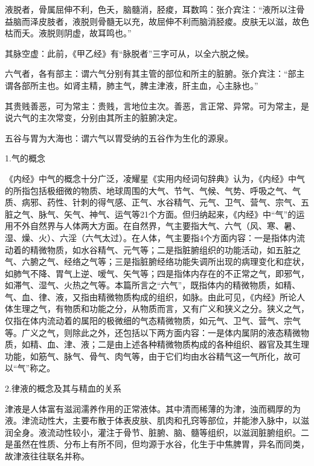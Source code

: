 \documentclass[12pt]{ctexbook}
\begin{document}
\begin{jiaozhu}
	\item 液脱者，骨属屈伸不利，色夭，脑髓消，胫痠，耳数鸣：张介宾注：“液所以注骨益脑而泽皮肢者，液脱则骨髓无以充，故屈伸不利而脑消胫痠。皮肤无以滋，故色枯而夭。液脱则阴虚，故耳鸣也。”
	\item 其脉空虚：此前，《甲乙经》有“脉脱者”三字可从，以全六脱之候。
	\item 六气者，各有部主：谓六气分别有其主管的部位和所主的脏腑。张介宾注：“部主谓各部所主也。如肾主精，肺主气，脾主津液，肝主血，心主脉也。”
	\item 其贵贱善恶，可为常主：贵贱，言地位主次。善恶，言正常、异常。可为常主，是说六气的主次常变，分别由其所主的脏腑决定。
	\item 五谷与胃为大海也：谓六气以胃受纳的五谷作为生化的源泉。
\end{jiaozhu}


1.气的概念

《内经》中气的概念十分广泛，凌耀星《实用内经词句辞典》认为，《内经》中气的所指包括极细微的物质、地球周围的大气、节气、气候、气势、呼吸之气、气质、病邪、药性、针刺的得气感、正气、水谷精气、元气、卫气、营气、宗气、五脏之气、脉气、矢气、神气、运气等21个方面。但归纳起来，《内经》中“气”的运用不外自然界与人体两大方面。在自然界，气主要指大气、六气（风、寒、暑、湿、燥、火）、六淫（六气太过）。在人体，气主要指4个方面内容：一是指体内流动着的精微物质，如水谷精气、元气等；二是指脏腑组织的功能活动，如五脏之气、六腑之气、经络之气等；三是指脏腑经络功能失调所出现的病理变化和症状，如肺气不降、胃气上逆、嗳气、矢气等；四是指体内存在的不正常之气，即邪气，如滞气、湿气、火热之气等。本篇所言之“六气”，既指体内的精微物质，如精、气、血、律、液，又指由精微物质构成的组织，如脉。由此可见，《内经》所论人体生理之气，有物质和功能之分，从物质而言，又有广义和狭义之分。狭义之气，仅指在体内流动着的属阳的极微细的气态精微物质，如元气、卫气、营气、宗气等。广义之气，则除此之外，还包括以下两方面内容：一是体内属阴的液态精微物质，如精、血、津、液；二是由上述各种精微物质构成的各种组织、器官及其生理功能，如筋气、脉气、骨气、肉气等，由于它们均由水谷精气这一气所化，故可以“气”称之。

2.律液的概念及其与精血的关系

津液是人体富有滋润濡养作用的正常液体。其中清而稀薄的为津，浊而稠厚的为液。津流动性大，主要布散于体表皮肤、肌肉和孔窍等部位，并能渗入脉中，以滋润全身。液流动性较小，灌注于骨节、脏腑、脑、髓等组织，以滋润脏腑组织。二是虽然在性质、分布上有所不同，但均源于水谷，化生于中焦脾胃，异名而同类，故津液往往联名并称。
\end{document}
